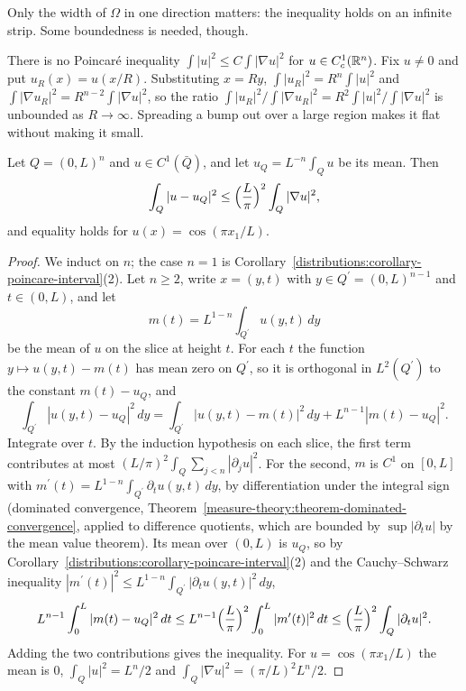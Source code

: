 Only the width of $\Omega$ in one direction matters: the inequality holds on an infinite strip. Some boundedness is needed, though.

\begin{counterexample}\label{distributions:counterexample-poincare-unbounded}
There is no Poincar\'e inequality $\int|u|^2 \leq C\int|\nabla u|^2$ for $u \in C^1_c(\mathbb{R}^n)$. Fix $u \neq 0$ and put $u_R(x) = u(x/R)$. Substituting $x = Ry$,
$\int|u_R|^2 = R^n\int|u|^2$ and $\int|\nabla u_R|^2 = R^{n-2}\int|\nabla u|^2$, so the ratio $\int|u_R|^2/\int|\nabla u_R|^2 = R^2\int|u|^2/\int|\nabla u|^2$ is unbounded as $R \to \infty$. Spreading a bump
out over a large region makes it flat without making it small.
\end{counterexample}

\begin{theorem}\label{distributions:theorem-poincare-cube}
Let $Q = (0, L)^n$ and $u \in C^1(\bar Q)$, and let $u_Q = L^{-n}\int_Qu$ be its mean. Then
\[
\int_Q|u - u_Q|^2 \leq \Bigl(\frac{L}{\pi}\Bigr)^2\int_Q|\nabla u|^2,
\]
and equality holds for $u(x) = \cos(\pi x_1/L)$.
\end{theorem}

\begin{proof}
We induct on $n$; the case $n = 1$ is Corollary~\ref{distributions:corollary-poincare-interval}(2). Let $n \geq 2$, write $x = (y, t)$ with $y \in Q^{\prime} = (0, L)^{n-1}$ and $t \in (0, L)$, and let
\[
m(t) = L^{1-n}\int_{Q^{\prime}}u(y, t)\,dy
\]
be the mean of $u$ on the slice at height $t$. For each $t$ the function $y \mapsto u(y, t) - m(t)$ has mean zero on $Q^{\prime}$, so it is orthogonal in $L^2(Q^{\prime})$ to the constant $m(t) - u_Q$, and
\[
\int_{Q^{\prime}}|u(y, t) - u_Q|^2\,dy = \int_{Q^{\prime}}|u(y, t) - m(t)|^2\,dy + L^{n-1}|m(t) - u_Q|^2 .
\]
Integrate over $t$. By the induction hypothesis on each slice, the first term contributes at most $(L/\pi)^2\int_Q\sum_{j < n}|\partial_ju|^2$. For the second, $m$ is $C^1$ on $[0, L]$ with
$m^{\prime}(t) = L^{1-n}\int_{Q^{\prime}}\partial_tu(y, t)\,dy$, by differentiation under the integral sign (dominated convergence, Theorem~\ref{measure-theory:theorem-dominated-convergence}, applied to difference
quotients, which are bounded by $\sup|\partial_tu|$ by the mean value theorem). Its mean over $(0, L)$ is $u_Q$, so by Corollary~\ref{distributions:corollary-poincare-interval}(2) and the
Cauchy--Schwarz inequality $|m^{\prime}(t)|^2 \leq L^{1-n}\int_{Q^{\prime}}|\partial_tu(y, t)|^2\,dy$,
\[
L^{n-1}\int_0^L|m(t) - u_Q|^2\,dt \leq L^{n-1}\Bigl(\frac{L}{\pi}\Bigr)^2\int_0^L|m^{\prime}(t)|^2\,dt \leq \Bigl(\frac{L}{\pi}\Bigr)^2\int_Q|\partial_tu|^2 .
\]
Adding the two contributions gives the inequality. For $u = \cos(\pi x_1/L)$ the mean is $0$, $\int_Q|u|^2 = L^n/2$ and $\int_Q|\nabla u|^2 = (\pi/L)^2L^n/2$.
\end{proof}

